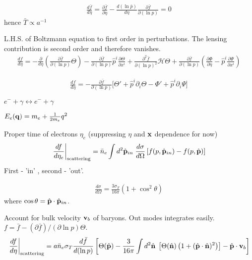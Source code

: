 \begin{align}
	\frac{d\bar{f}}{d\eta} = \frac{\partial \bar{f}}{\partial\eta} - \frac{d(\ln\bar{p})}{d\eta} \frac{\partial \bar{f}}{\partial(\ln p)} = 0
\end{align}
hence $\bar{T}\propto a^{-1}$

L.H.S. of Boltzmann equation to first order in perturbations. The lensing contribution is second order and therefore vanishes.
\begin{align}
	\frac{df}{d\eta} = - \frac{\partial}{d\eta} \left( \frac{\partial \bar{f}}{\partial(\ln p)} \Theta \right) - \frac{\partial \bar{f}}{\partial (\ln p)} \hat{p}^i \frac{\partial \Theta}{\partial x^i} +  \frac{\partial^2 \bar{f}}{\partial(\ln p)^2} \mathcal{H}\Theta + \frac{\partial \bar{f}}{\partial (\ln p)} \left( \frac{\partial \Phi}{\partial \eta} - \hat{p}^i \frac{\partial \Psi}{\partial x^i} \right)
\end{align}

\begin{align}
	 \frac{df}{d\eta} = - \frac{\partial \bar{f}}{\partial (\ln p)} \biggl[ \Theta' + \hat{p}^i \partial_i \Theta - \Phi' + \hat{p}^i \partial_i \Psi \biggr] 
\end{align}

$e^- + \gamma \leftrightarrow e^- + \gamma$

$E_e (\mathbf{q}) = m_e + \frac{1}{2m_e} q^2$

Proper time of electrons $\eta_e$ (suppressing $\eta$ and $\mathbf{x}$ dependence for now)
\begin{align}
	\left. \frac{df}{d\eta_e} \right|_\text{scattering} = \bar{n}_e \int d^2 \hat{\mathbf{p}}_{in} \; \frac{d\sigma}{d\Omega} \left[ f(p,\hat{\mathbf{p}}_{in}) - f(p,\hat{\mathbf{p}})\right]
\end{align}
First - 'in' , second - 'out'.

\begin{align}
	\frac{d\sigma}{d\Omega} = \frac{3\sigma_T}{16\pi} (1 + \cos^2 \theta)
\end{align}
where $\cos\theta = \hat{\mathbf{p}} \cdot \hat{\mathbf{p}}_{in}$.

Account for bulk velocity $\mathbf{v}_b$ of baryons. Out modes integrates easily. $f = \bar{f} - (\partial\bar{f})/(\partial\ln p) \Theta$.
\begin{align}
	\left. \frac{df}{d\eta} \right|_\text{scattering} = a \bar{n}_e \sigma_T \frac{d\bar{f}}{d(\ln p)}  \left[ \Theta(\hat{\mathbf{p}}) - \frac{3}{16\pi} \int d^2 \hat{\mathbf{n}} \; \left[ \Theta(\hat{\mathbf{n}}) \left( 1 + (\hat{\mathbf{p}} \cdot \hat{\mathbf{n}})^2 \right) \right] - \hat{\mathbf{p}} \cdot \mathbf{v}_b \right]
\end{align}

